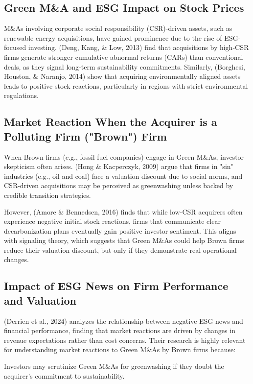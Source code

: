 \documentclass[a4paper]{article}
\begin{document}
\subsection{Green M\&A and ESG Impact on Stock Prices}
M\&As involving corporate social responsibility (CSR)-driven assets, such as renewable energy acquisitions, have gained prominence due to the rise of ESG-focused investing. (Deng, Kang, \& Low, 2013) \autocite{deng2013} find that acquisitions by high-CSR firms generate stronger cumulative abnormal returns (CARs) than conventional deals, as they signal long-term sustainability commitments. Similarly, (Borghesi, Houston, \& Naranjo, 2014) \autocite{borghesi2014} show that acquiring environmentally aligned assets leads to positive stock reactions, particularly in regions with strict environmental regulations.

\subsection{Market Reaction When the Acquirer is a Polluting Firm ("Brown") Firm}
When Brown firms (e.g., fossil fuel companies) engage in Green M\&As, investor skepticism often arises. (Hong \& Kacperczyk, 2009) \autocite{hong2009} argue that firms in "sin" industries (e.g., oil and coal) face a valuation discount due to social norms, and CSR-driven acquisitions may be perceived as greenwashing unless backed by credible transition strategies.

However, (Amore \& Bennedsen, 2016) \autocite{amore2016} finds that while low-CSR acquirers often experience negative initial stock reactions, firms that communicate clear decarbonization plans eventually gain positive investor sentiment. This aligns with signaling theory, which suggests that Green M\&As could help Brown firms reduce their valuation discount, but only if they demonstrate real operational changes.

\subsection{Impact of ESG News on Firm Performance and Valuation}
(Derrien et al., 2024) \autocite{derrien2024} analyzes the relationship between negative ESG news and financial performance, finding that market reactions are driven by changes in revenue expectations rather than cost concerns. Their research is highly relevant for understanding market reactions to Green M\&As by Brown firms because:

\textbullet Investors may scrutinize Green M\&As for greenwashing if they doubt the acquirer's commitment to sustainability.
\end{document}
